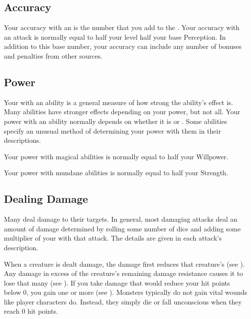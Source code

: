     \subsection{Accuracy}\label{Accuracy}
        Your accuracy with an  is the number that you add to the .
        Your accuracy with an attack is normally equal to half your level \add half your base Perception.
        In addition to this base number, your accuracy can include any number of bonuses and penalties from other sources.

    \subsection{Power}\label{Power}
        Your  with an ability is a general measure of how strong the ability's effect is.
        Many abilities have stronger effects depending on your power, but not all.
        Your power with an ability normally depends on whether it is  or .
        Some abilities specify an unusual method of determining your power with them in their descriptions.

        Your power with magical abilities is normally equal to half your Willpower.

        Your power with mundane abilities is normally equal to half your Strength.

    \subsection{Dealing Damage}\label{Dealing Damage}
        Many  deal damage to their targets.
        In general, most damaging attacks deal an amount of damage determined by rolling some number of dice and adding some multiplier of your  with that attack.
        The details are given in each attack's description.

        When a creature is dealt damage, the damage first reduces that creature's  (see ).
        Any damage in excess of the creature's remaining damage resistance causes it to lose that many  (see ).
        If you take damage that would reduce your hit points below 0, you gain one or more  (see ).
        Monsters typically do not gain vital wounds like player characters do.
        Instead, they simply die or fall unconscious when they reach 0 hit points.

